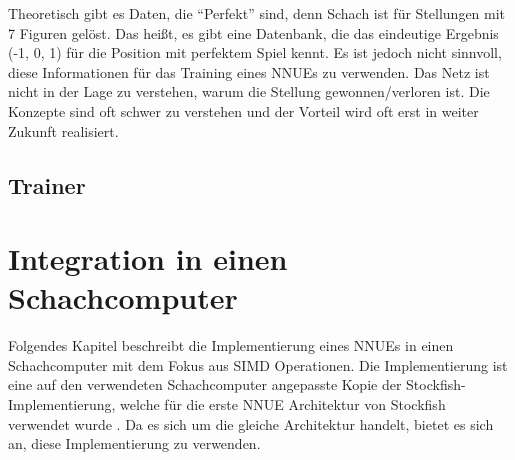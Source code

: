 Theoretisch gibt es Daten, die \enquote{Perfekt} sind, denn Schach ist für Stellungen mit 7 Figuren gelöst. Das heißt, es gibt eine Datenbank, die das eindeutige Ergebnis (-1, 0, 1) für die Position mit perfektem Spiel kennt. Es ist jedoch nicht sinnvoll, diese Informationen für das Training eines \acp{NNUE} zu verwenden. Das Netz ist nicht in der Lage zu verstehen, warum die Stellung gewonnen/verloren ist. Die Konzepte sind oft schwer zu verstehen und der Vorteil wird oft erst in weiter Zukunft realisiert.

\subsection{Trainer}


\cite{Zeiler2012}



\section{Integration in einen Schachcomputer}
\label{chap:integration}

Folgendes Kapitel beschreibt die Implementierung eines \acp{NNUE} in einen Schachcomputer mit dem Fokus aus \ac{SIMD} Operationen. Die Implementierung ist eine auf den verwendeten Schachcomputer angepasste Kopie der Stockfish-Implementierung, welche für die erste \ac{NNUE} Architektur von Stockfish verwendet wurde \cite{StockfishRepo}. Da es sich um die gleiche Architektur handelt, bietet es sich an, diese Implementierung zu verwenden.

